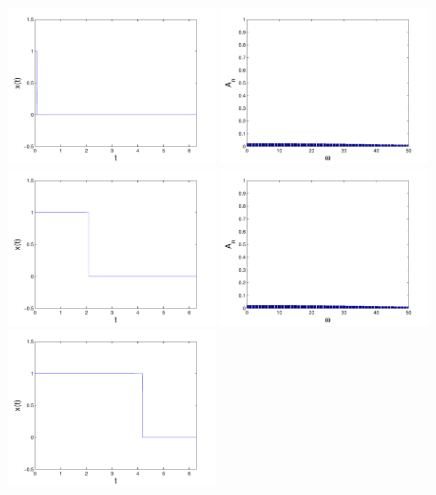 \begin{refsection}
\begin{figure}
\centering
\includegraphics[width=0.49\textwidth]{kugel/Dkonstant/Rechteck1_1.pdf}
\includegraphics[width=0.49\textwidth]{kugel/Dkonstant/Rechteck1_2.pdf}
\includegraphics[width=0.49\textwidth]{kugel/Dkonstant/Rechteck2_1.pdf}
\includegraphics[width=0.49\textwidth]{kugel/Dkonstant/Rechteck1_2.pdf}
\includegraphics[width=0.49\textwidth]{kugel/Dkonstant/Rechteck3_1.pdf}

\end{figure}
\end{refsection}
